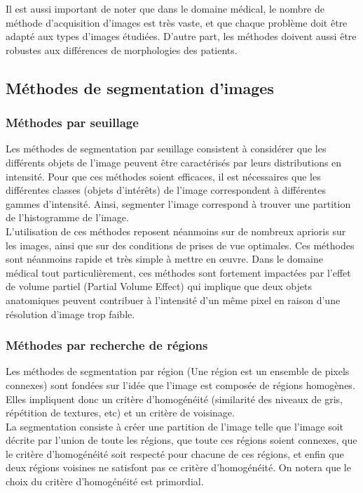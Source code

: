 Il est aussi important de noter que dans le domaine médical, le nombre de méthode d'acquisition d'images est très vaste, et que chaque problème doit être adapté aux types d'images étudiées. D'autre part, les méthodes doivent aussi être robustes aux différences de morphologies des patients.


\subsection{Méthodes de segmentation d'images}
\subsubsection*{Méthodes par seuillage}
Les méthodes de segmentation par seuillage consistent à considérer que les différents objets de l'image peuvent être caractérisés par leurs distributions en intensité. Pour que ces méthodes soient efficaces, il est nécessaires que les différentes classes (objets d'intérêts) de l'image correspondent à différentes gammes d'intensité. Ainsi, segmenter l'image correspond à trouver une partition de l'histogramme de l'image.\\

L'utilisation de ces méthodes reposent néanmoins sur de nombreux aprioris sur les images, ainsi que sur des conditions de prises de vue optimales. Ces méthodes sont néanmoins rapide et très simple à mettre en œuvre. Dans le domaine médical tout particulièrement, ces méthodes sont fortement impactées par l'effet de volume partiel (Partial Volume Effect) qui implique que deux objets anatomiques peuvent contribuer à l'intensité d'un même pixel en raison d'une résolution d'image trop faible.

\subsubsection*{Méthodes par recherche de régions}
Les méthodes de segmentation par région (Une région est un ensemble de pixels connexes) sont fondées sur l'idée que l'image est composée de régions homogènes. Elles impliquent donc un critère d'homogénéité (similarité des niveaux de gris, répétition de textures, etc) et un critère de voisinage.\\

La segmentation consiste à créer une partition de l'image telle que l'image soit décrite par l'union de toute les régions, que toute ces régions soient connexes, que le critère d'homogénéité soit respecté pour chacune de ces régions, et enfin que deux régions voisines ne satisfont pas ce critère d'homogénéité. On notera que le choix du critère d'homogénéité est primordial.


